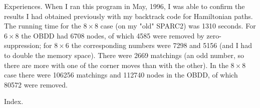 Experiences. When I ran this program in May, 1996, I was able to
confirm the results I had obtained previously with my backtrack code for
Hamiltonian paths. The running time for the $8\times8$ case (on my "old"
SPARC2) was 1310 seconds. For $6\times8$ the OBDD had 6708 nodes, of which
4585 were removed by zero-suppression; for $8\times6$ the corresponding
numbers were 7298 and 5156 (and I had to double the memory space).
There were 2669 matchings (an odd number, so there are more with one of the
corner moves than with the other). In the $8\times8$ case there were 106256
matchings and 112740 nodes in the OBDD, of which 80572 were removed.

\fi

Index.
\fi

\inx
\fin
\con
